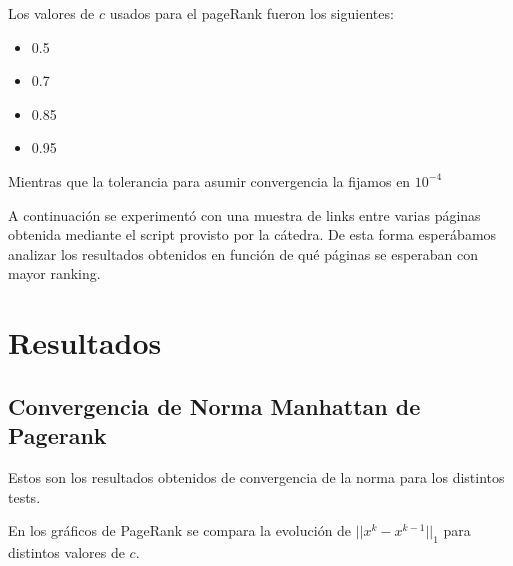 \documentclass[a4paper]{article}
\begin{document}
Los valores de $c$ usados para el pageRank fueron los siguientes:
\begin{itemize}
\item 0.5
\item 0.7
\item 0.85
\item 0.95
\end{itemize}
Mientras que la tolerancia para asumir convergencia la fijamos en $10^{-4}$

A continuación se experimentó con una muestra de links entre varias páginas obtenida mediante el script provisto por la cátedra. De esta forma esperábamos analizar los resultados obtenidos en función de qué páginas se esperaban con mayor ranking.

\newpage
\section{Resultados}
\label{sec:res}
\subsection{Convergencia de Norma Manhattan de Pagerank}

Estos son los resultados obtenidos de convergencia de la norma para los distintos tests.

En los gráficos de PageRank se compara la evolución de $||x^k-x^{k-1}||_1$ para distintos valores de $c$.\\
\end{document}
